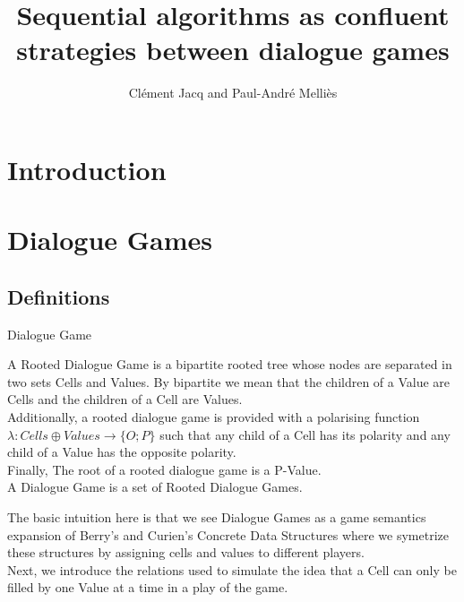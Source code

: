 \documentclass[a4paper,UKenglish]{lipics}
\title{Sequential algorithms as confluent strategies between dialogue games}
\author{Clément Jacq and Paul-André Melliès}
\begin{document}
\maketitle

\section*{Introduction}
\hspace{1.2cm}  

\section{Dialogue Games}
\subsection{Definitions}
\begin{definition}{Dialogue Game}

A Rooted Dialogue Game is a bipartite rooted tree whose nodes are separated in two sets Cells and Values. By bipartite we mean that the children of a Value are Cells and the children of a Cell are Values. \\Additionally, a rooted dialogue game is provided with a polarising function $\lambda : Cells \oplus Values \rightarrow \{O;P\}$ such that any child of a Cell has its polarity and any child of a Value has the opposite polarity.\\
Finally, The root of a rooted dialogue game is a P-Value. \\
A Dialogue Game is a set of Rooted Dialogue Games.
\end{definition}
The basic intuition here is that we see Dialogue Games as a game semantics expansion of Berry's and Curien's Concrete Data Structures where we symetrize these structures by assigning cells and values to different players.\\ Next, we introduce the relations used to simulate the idea that a Cell can only be filled by one Value at a time in a play of the game.
\end{document}

